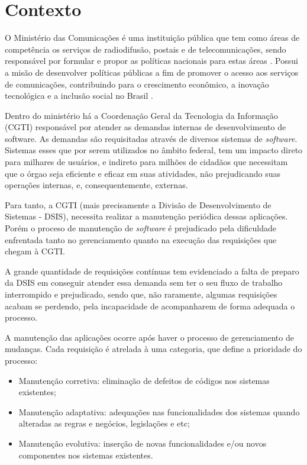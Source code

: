 \chapter[Contexto]{Contexto}

O Ministério das Comunicações é uma instituição pública que tem como áreas de competência os serviços de radiodifusão, postais e de telecomunicações, sendo responsável por formular e propor as políticas nacionais para estas áreas \cite{mcsite001}. Possui a misão de desenvolver políticas públicas a fim de promover o acesso aos serviços de comunicações, contribuindo para o crescimento econômico, a inovação tecnológica e a inclusão social no Brasil \cite{mcsite001}.

Dentro do ministério há a Coordenação Geral da Tecnologia da Informação (CGTI) responsável por atender as demandas internas de desenvolvimento de software. As demandas são requisitadas através de diversos sistemas de \emph{software}. Sistemas esses que por serem utilizados no âmbito federal, tem um impacto direto para milhares de usuários, e indireto para milhões de cidadãos que necessitam que o órgao seja eficiente e eficaz em suas atividades, não prejudicando suas operações internas, e, consequentemente, externas.

Para tanto, a CGTI (mais precisamente a Divisão de Desenvolvimento de Sistemas - DSIS), necessita realizar a manutenção periódica dessas aplicações. Porém o proceso de manutenção de \emph{software} é prejudicado pela dificuldade enfrentada tanto no gerenciamento quanto na execução das requisições que chegam à CGTI.

A grande quantidade de requisições contínuas tem evidenciado a falta de preparo da DSIS em conseguir atender essa demanda sem ter o seu fluxo de trabalho interrompido e prejudicado, sendo que, não raramente, algumas requisições acabam se perdendo, pela incapacidade de acompanharem de forma adequada o processo.

A manutenção das aplicações ocorre após haver o processo de gerenciamento de mudanças. Cada requisição é atrelada à uma categoria, que define a prioridade do processo:

\begin{itemize}
  \item Manutenção corretiva: eliminação de defeitos de códigos nos sistemas existentes;
  \item Manutenção adaptativa: adequações nas funcionalidades dos sistemas quando alteradas as regras e negócios, legislações e etc;
  \item Manutenção evolutiva: inserção de novas funcionalidades e/ou novos componentes nos sistemas existentes.
\end{itemize}

